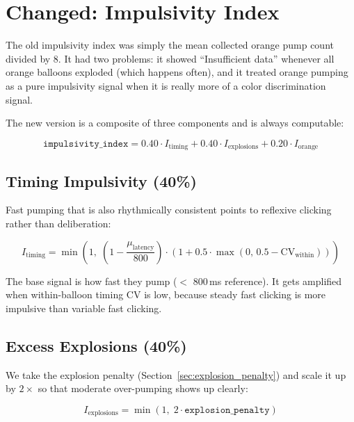 \documentclass[11pt,a4paper]{article}
\begin{document}
\section{Changed: Impulsivity Index}
\label{sec:impulsivity}

The old impulsivity index was simply the mean collected orange pump count
divided by 8. It had two problems: it showed ``Insufficient data'' whenever
all orange balloons exploded (which happens often), and it treated orange
pumping as a pure impulsivity signal when it is really more of a color
discrimination signal.

The new version is a composite of three components and is always computable:

\begin{equation}
\boxed{
    \texttt{impulsivity\_index} = 0.40 \cdot I_{\text{timing}}
    + 0.40 \cdot I_{\text{explosions}}
    + 0.20 \cdot I_{\text{orange}}
}
\end{equation}

\subsection{Timing Impulsivity (40\%)}

Fast pumping that is also rhythmically consistent points to reflexive clicking
rather than deliberation:

\begin{equation}
    I_{\text{timing}} = \min\!\left(1,\;
        \left(1 - \frac{\mu_{\text{latency}}}{800}\right) \cdot
        \left(1 + 0.5 \cdot \max(0,\, 0.5 - \text{CV}_{\text{within}})\right)
    \right)
\end{equation}

The base signal is how fast they pump ($<$ 800\,ms reference). It gets
amplified when within-balloon timing CV is low, because steady fast clicking
is more impulsive than variable fast clicking.

\subsection{Excess Explosions (40\%)}

We take the explosion penalty (Section~\ref{sec:explosion_penalty}) and
scale it up by $2\times$ so that moderate over-pumping shows up clearly:

\begin{equation}
    I_{\text{explosions}} = \min(1,\; 2 \cdot \texttt{explosion\_penalty})
\end{equation}
\end{document}
